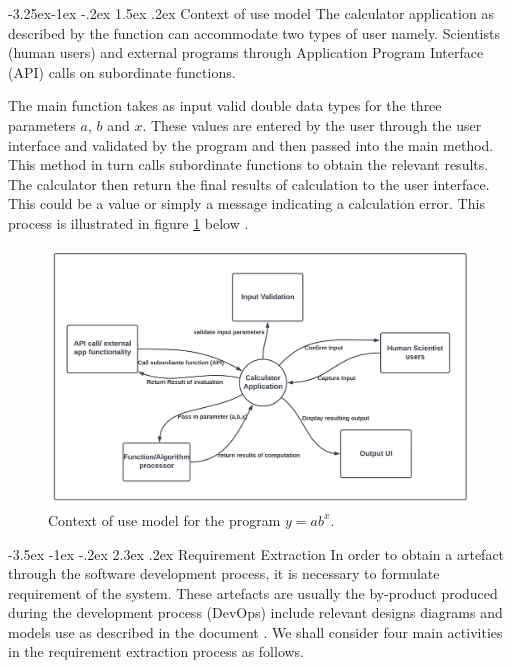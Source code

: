 \documentclass[11pt]{article}
\makeatletter
\renewcommand\section{\@startsection {section}{1}{\z@}%
                                       {-3.5ex \@plus -1ex \@minus -.2ex}%
                                       {2.3ex \@plus.2ex}%
                                       {\normalfont\fontfamily{phv}\fontsize{16}{19}\bfseries}}
\renewcommand\subsection{\@startsection{subsection}{2}{\z@}%
                                         {-3.25ex\@plus -1ex \@minus -.2ex}%
                                         {1.5ex \@plus .2ex}%
                                         {\normalfont\fontfamily{phv}\fontsize{14}{17}\bfseries}}
\makeatother
\begin{document}
\subsection{Context of use model}
The calculator application as described by the function can accommodate two types of user namely. Scientists (human users) and external programs through Application Program Interface (API) calls on subordinate functions.\par
The main function takes as input valid double data types for the three parameters $a$, $b$ and $x$. These values are entered by the user through the user interface and validated by the program and then passed into the main method. This method in turn calls subordinate functions to obtain the relevant results. The calculator then return the final results of calculation to the user interface. This could be a value or simply a message indicating a calculation error. This process is illustrated in figure \ref{fig3} below \cite{contextofuse}.
\begin{figure}[H]
	\centering
	\includegraphics[width=\linewidth]{Figures/ContextDiagram}
	\caption{Context of use model for the program $y=ab^x$.}
	\label{fig3}
\end{figure}

\section{Requirement Extraction} \label{s:sec2}
In order to obtain a artefact through the software development process, it is necessary to formulate requirement of the system. These artefacts are usually the by-product produced during the development process (DevOps) include relevant designs diagrams and models use as described in the document \cite{ravid2000method}. We shall consider four main activities in the requirement extraction process as follows.
\end{document}
